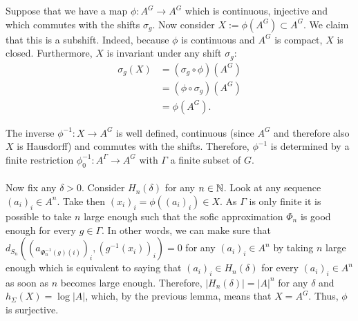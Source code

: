 Suppose that we have a map $\phi: A^G \to A^G$ which is continuous, injective and which commutes with the shifts $\sigma_g$. Now consider $X := \phi(A^G) \subset A^G$. We claim that this is a subshift. Indeed, because $\phi$ is continuous and $A^G$ is compact, $X$ is closed. Furthermore, $X$ is invariant under any shift $\sigma_g$: 
		\begin{align*}
		\sigma_g(X)
		&= (\sigma_g \circ \phi) (A^G) \\
		&= (\phi \circ \sigma_g)(A^G) \\
		&= \phi(A^G).
		\end{align*}
		
The inverse $\phi^{-1}: X \to A^G$ is well defined, continuous (since $A^G$ and therefore also $X$ is Hausdorff) and commutes with the shifts. Therefore,  $\phi^{-1}$ is determined by a finite restriction $\phi^{-1}_0: A^{\Gamma} \to A^G$ with $\Gamma$ a finite subset of $G$. \\
\\
Now fix any $\delta > 0$. Consider $H_n(\delta)$ for any $n \in \mathbb{N}$. Look at any sequence $(a_i)_i \in A^n$. Take then $(x_i)_i = \phi((a_i)_i) \in X$. As $\Gamma$ is only finite it is possible to take $n$ large enough such that the sofic approximation $\Phi_n$ is good enough for every $g \in \Gamma$. In other words, we can make sure that $d_{S_n}((a_{\Phi^{-1}_n(g)(i)})_i,(g^{-1}(x_i))_i) = 0$  for any  $(a_i)_i \in A^n$ by taking $n$ large enough which is equivalent to saying that $(a_i)_i \in H_n(\delta)$ for every $(a_i)_i \in A^n$ as soon as $n$ becomes large enough. Therefore, $|H_n(\delta)| = |A|^{n}$ for any $\delta$ and $h_\Sigma(X) = \log |A|$, which, by the previous lemma, means that $X = A^G$. Thus, $\phi$ is surjective. 
